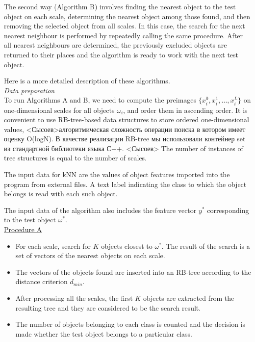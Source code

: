 \documentclass[entropy,article,submit,moreauthors,pdftex]{Definitions/mdpi}
\begin{document}
\begin{paracol}{2}
The second way (Algorithm B) involves finding the nearest object to the test object on each scale, determining the nearest object among those found, and then removing the selected object from all scales. In this case, the search for the next nearest neighbour is performed by repeatedly calling the same procedure. After all nearest neighbours are determined, the previously excluded objects are returned to their places and the algorithm is ready to work with the next test object.

Here is a more detailed description of these algorithms.
\\[12pt]
\textit{Data preparation}
\\[12pt]
To run Algorithms A and B, we need to compute the preimages $\{x_i^0, x_i^1, ..., x_i^L\}$ on one-dimensional scales for all objects $\omega_i$, and order them in ascending order. It is convenient to use RB-tree-based data structures to store ordered one-dimensional values, <Сысоев>алгоритмическая сложность операции поиска в котором имеет оценку O(logN). В качестве реализации RB-tree мы использовали контейнер set из стандартной библиотеки языка С++. <Сысоев> The number of instances of tree structures is equal to the number of scales.

The input data for kNN are the values of object features imported into the program from external files. A text label indicating the class to which the object belongs is read with each such object.

The input data of the algorithm also includes the feature vector $y^*$ corresponding to the test object $\omega^*$.\\

\underline{Procedure A}

\begin{itemize}
\item For each scale, search for $K$ objects closest to $\omega^*$. The result of the search is a set of vectors of  the nearest objects on each scale.
\item The vectors of the objects found are inserted into an RB-tree according to the distance criterion $d_{min}$.
\item After processing all the scales, the first $K$ objects are extracted from the resulting tree and they are considered to be the search result.
\item The number of objects belonging to each class is counted and the decision is made whether   the test object belongs to a particular class.
\end{itemize}


\end{paracol}
\end{document}
